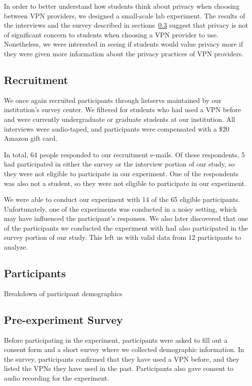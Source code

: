 In order to better understand how students think about privacy when choosing between VPN providers, we designed a small-scale lab experiment. 
The results of the interviews and the survey described in sections~\ref{} suggest that privacy is not of significant concern to students when choosing a VPN provider to use.
Nonetheless, we were interested in seeing if students would value privacy more if they were given more information about the privacy practices of VPN providers.

\subsection{Recruitment} 
We once again recruited participants through listservs maintained by our institution's survey center.
We filtered for students who had used a VPN before and were currently undergraduate or graduate students at our institution.
All interviews were audio-taped, and participants were compensated with a \$20 Amazon gift card.

In total, 64 people responded to our recruitment e-mails.
Of these respondents, 5 had participated in either the survey or the interview portion of our study, so they were not eligible to participate in our experiment.
One of the respondents was also not a student, so they were not eligible to participate in our experiment.

We were able to conduct our experiment with 14 of the 65 eligible participants. 
Unfortunately, one of the experiments was conducted in a noisy setting, which may have influenced the participant's responses.
We also later discovered that one of the participants we conducted the experiment with had also participated in the survey portion of our study.
This left us with valid data from 12 participants to analyze.

\subsection{Participants} 
Breakdown of participant demographics

\subsection{Pre-experiment Survey} 
Before participating in the experiment, participants were asked to fill out a consent form and a short survey where we collected demographic information.
In the survey, participants confirmed that they have used a VPN before, and they listed the VPNs they have used in the past.
Participants also gave consent to audio recording for the experiment.

